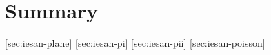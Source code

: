 


\section{Summary}


\cref{sec:iesan-plane}
\cref{sec:iesan-pi}
\cref{sec:iesan-pii}
\cref{sec:iesan-poisson}

